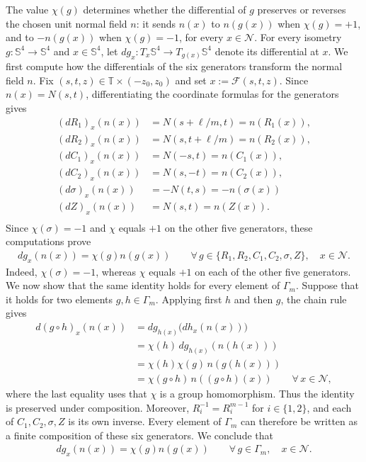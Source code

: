 \documentclass[a4paper,11pt,oneside,reqno]{amsart}
\numberwithin{equation}{section}
\theoremstyle{definition}
\begin{document}
The value $\chi(g)$ determines whether the differential
of $g$ preserves or reverses the chosen unit normal field $n$:
it sends $n(x)$ to $n(g(x))$ when $\chi(g)=+1$, and to
$-n(g(x))$ when $\chi(g)=-1$, for every $x\in\mathcal N$.
For every isometry $g:\mathbb S^4\to\mathbb S^4$ and
$x\in\mathbb S^4$, let $dg_x:T_x\mathbb S^4\rightarrow T_{g(x)}\mathbb S^4$ denote its differential at $x$. We first compute how the differentials of the six generators transform the normal field $n$. Fix
$(s,t,z)\in\mathbb T\times(-z_0,z_0)$ and set
$x:=\mathcal F(s,t,z)$. Since $n(x)=N(s,t)$,
differentiating the coordinate formulas for the generators gives
%
\begin{align*}
    (dR_1)_x(n(x))
    &=N(s+\ell/m,t)=n(R_1(x)),\\
    (dR_2)_x(n(x))
    &=N(s,t+\ell/m)=n(R_2(x)),\\
    (dC_1)_x(n(x))
    &=N(-s,t)=n(C_1(x)),\\
    (dC_2)_x(n(x))
    &=N(s,-t)=n(C_2(x)),\\
    (d\sigma)_x(n(x))
    &=-N(t,s)=-n(\sigma(x))\\
    (dZ)_x(n(x))
    &=N(s,t)=n(Z(x)).\\
\end{align*}
%
Since $\chi(\sigma)=-1$ and $\chi$ equals $+1$ on the
other five generators, these computations prove
%
\begin{align*}
    dg_x(n(x))=\chi(g)n(g(x))
    \qquad
    \forall\,g\in\{R_1,R_2,C_1,C_2,\sigma,Z\},
    \quad x\in\mathcal N.
\end{align*}
Indeed, $\chi(\sigma)=-1$, whereas $\chi$ equals $+1$
on each of the other five generators. We now show that the same identity holds for every element of $\Gamma_m$. Suppose that it holds for two elements
$g,h\in\Gamma_m$. Applying first $h$ and then $g$, the
chain rule gives
%
\begin{align*}
    d(g\circ h)_x(n(x))
    &=dg_{h(x)}\bigl(dh_x(n(x))\bigr)\\
    &=\chi(h)\,dg_{h(x)}(n(h(x)))\\
    &=\chi(h)\chi(g)\,n(g(h(x)))\\
    &=\chi(g\circ h)\,n((g\circ h)(x))
    \qquad\forall\,x\in\mathcal N,
\end{align*}
%
where the last equality uses that $\chi$ is a group
homomorphism. Thus the identity is preserved under composition.
Moreover, $R_i^{-1}=R_i^{m-1}$ for $i\in\{1,2\}$, and
each of $C_1,C_2,\sigma,Z$ is its own inverse. Every element
of $\Gamma_m$ can therefore be written as a finite composition
of these six generators. We conclude that
%
\begin{align}
    \label{eq:s4-character}
    dg_x(n(x))=\chi(g)n(g(x))
    \qquad\forall\,g\in\Gamma_m,\quad x\in\mathcal N.
\end{align}
%
\end{document}
